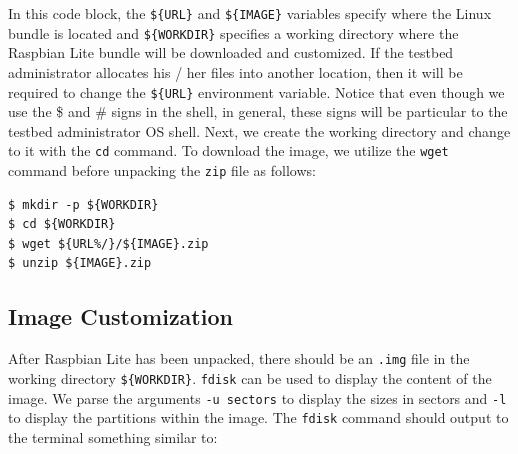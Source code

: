 \documentclass[electronics,article,accept,moreauthors,pdftex,10pt,a4paper]{mdpi}
\theoremstyle{mdpi}
\newcounter{ex}
\newcounter{re}
\theoremstyle{mdpidefinition}
\begin{document}
In this code block, the \texttt{\$\{URL\}} and \texttt{\$\{IMAGE\}}
variables specify where the Linux bundle is located and
\texttt{\$\{WORKDIR\}} specifies a working directory where the Raspbian
Lite bundle will be downloaded and customized. If the testbed administrator
allocates his / her files into another location, then it will be required to
change the \texttt{\$\{URL\}} environment variable. Notice that even though we
use the \$ and \# signs in the shell, in general, these signs will be
particular to the testbed administrator OS shell. Next, we create
the working directory and change to it with the \texttt{cd} command. To
download the image, we utilize the \texttt{wget} command before unpacking
the \texttt{zip} file as follows:



\begin{lstlisting}[]
$ mkdir -p ${WORKDIR}
$ cd ${WORKDIR}
$ wget ${URL%/}/${IMAGE}.zip
$ unzip ${IMAGE}.zip
\end{lstlisting}
\FloatBarrier
\vspace{-6mm}


\subsection{Image Customization}

After Raspbian Lite has been unpacked, there should be an \texttt{.img}
file in the working directory \texttt{\$\{WORKDIR\}}. \texttt{fdisk} can
be used to display the content of the image. We parse the arguments \texttt{-u sectors}
to display the sizes in sectors and \texttt{-l} to display the partitions
within the image. The \texttt{fdisk} command should output to the terminal
something similar to:
\end{document}
